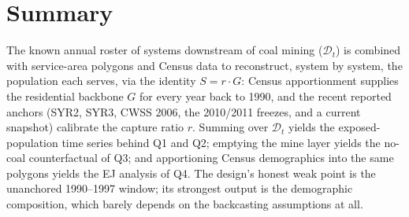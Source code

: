 \documentclass[11pt]{article}
\newcommand{\popserved}{\ensuremath{S}}
\newcommand{\geopop}{\ensuremath{G}}
\newcommand{\ratio}{\ensuremath{r}}
\begin{document}
\section*{Summary}
The known annual roster of systems downstream of coal mining ($\mathcal{D}_t$) is
combined with service-area polygons and Census data to reconstruct, system by system,
the population each serves, via the identity
$\popserved = \ratio\cdot\geopop$: Census apportionment supplies the residential
backbone $\geopop$ for every year back to 1990, and the recent reported anchors
(SYR2, SYR3, CWSS 2006, the 2010/2011 freezes, and a current snapshot) calibrate the
capture ratio $\ratio$. Summing over $\mathcal{D}_t$ yields the exposed-population time series
behind Q1 and Q2; emptying the mine layer yields the no-coal counterfactual of Q3; and
apportioning Census demographics into the same polygons yields the EJ analysis of Q4.
The design's honest weak point is the unanchored 1990--1997 window; its strongest
output is the demographic composition, which barely depends on the backcasting
assumptions at all.
\end{document}
